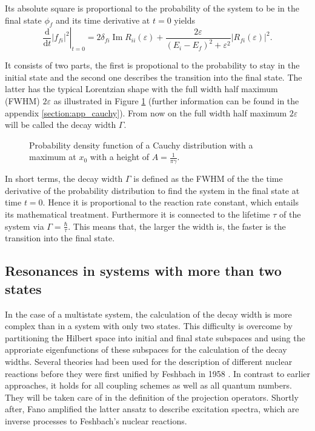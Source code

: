 Its absolute square is proportional to the probability of the system to be
in the final state $\phi_f$ and its time derivative at $t=0$ yields
\begin{equation}
  \left . \frac{\mathrm{d}}{\mathrm{d}t} |f_{fi}|^2 \right |_{t=0}
  = 2\delta_{fi} \operatorname{Im}R_{ii}(\varepsilon) 
    + \frac{2\varepsilon}{(E_i-E_f)^2+\varepsilon^2} |R_{fi}(\varepsilon)|^2 .
\end{equation}

It consists of two parts, the first is propotional to the probability to stay
in the initial state and the second one describes the transition into the
final state. The latter has the typical Lorentzian shape with the full width
half maximum
(FWHM) $2 \varepsilon$ as illustrated in Figure \ref{figure:general_resonance}
(further information can be found in the appendix
\ref{section:app_cauchy}). From now on
the full width half maximum ${2\varepsilon}$ will be called the
decay width $\Gamma$.

\begin{figure}[h]
  \centering
  
  \caption{Probability density function of a Cauchy distribution with a
           maximum at $x_0$ with a height of $A=\frac{1}{\pi\gamma}$.}
  \label{figure:general_resonance}
\end{figure}

In short terms, the decay width $\Gamma$ is defined as the FWHM of the
the time derivative of the probability distribution to find the system in
the final state at time $t=0$. Hence it is proportional to the reaction rate
constant, which entails its mathematical treatment. Furthermore it is
connected to the lifetime $\tau$ of the
system via $\Gamma=\frac \hbar \tau$.
This means that, the larger the width is, the faster is the transition
into the final state.


\subsection{Resonances in systems with more than two states}

In the case of a multistate system, the calculation of the decay width is more
complex than in a system with only two states.
This difficulty is overcome by partitioning the Hilbert space into initial and final
state subspaces and using the approriate eigenfunctions of these subspaces for the
calculation of the decay widths. 
Several theories had been used for the description of different nuclear reactions
before they were first unified by Feshbach in 1958 \cite{Feshbach58,Feshbach62,Feshbach_book}.
In contrast to earlier approaches, it holds for all coupling schemes as well as
all quantum numbers. They will be taken care of in the definition of the
projection operators.
Shortly after,
Fano amplified the latter ansatz to describe excitation spectra, which
are inverse processes to Feshbach's nuclear reactions.\cite{Fano61}


